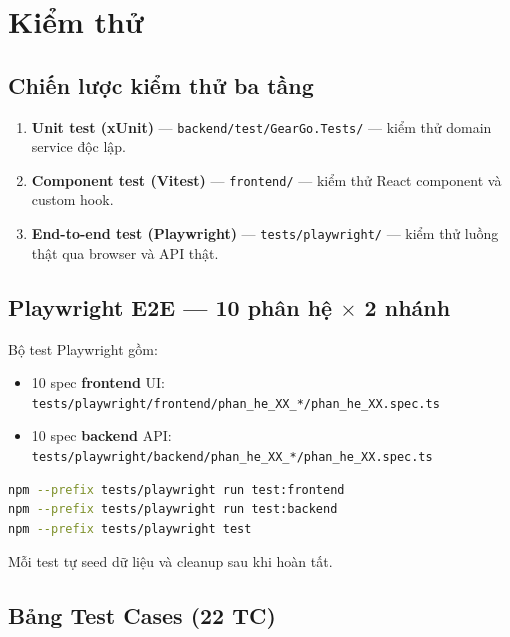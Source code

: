 \chapter{Kiểm thử}
\label{chuong:kiem_thu}

\section{Chiến lược kiểm thử ba tầng}
\label{sec:chien_luoc_test}

\begin{enumerate}
  \item \textbf{Unit test (xUnit)} --- \texttt{backend/test/GearGo.Tests/} --- kiểm thử domain service độc lập.
  \item \textbf{Component test (Vitest)} --- \texttt{frontend/} --- kiểm thử React component và custom hook.
  \item \textbf{End-to-end test (Playwright)} --- \texttt{tests/playwright/} --- kiểm thử luồng thật qua browser và API thật.
\end{enumerate}

\section{Playwright E2E --- 10 phân hệ $\times$ 2 nhánh}
\label{sec:playwright}

Bộ test Playwright gồm:
\begin{itemize}
  \item 10 spec \textbf{frontend} UI: \texttt{tests/playwright/frontend/phan\_he\_XX\_*/phan\_he\_XX.spec.ts}
  \item 10 spec \textbf{backend} API: \texttt{tests/playwright/backend/phan\_he\_XX\_*/phan\_he\_XX.spec.ts}
\end{itemize}

\begin{lstlisting}[language=bash, caption={Lệnh chạy Playwright}]
npm --prefix tests/playwright run test:frontend
npm --prefix tests/playwright run test:backend
npm --prefix tests/playwright test
\end{lstlisting}

Mỗi test tự seed dữ liệu và cleanup sau khi hoàn tất.

\section{Bảng Test Cases (22 TC)}
\label{sec:tc}

